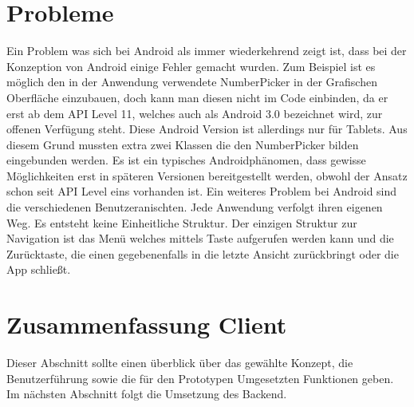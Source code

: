 \section{Probleme}

Ein Problem was sich bei Android als immer wiederkehrend zeigt ist, dass bei der Konzeption von Android einige Fehler gemacht wurden. Zum Beispiel ist es möglich den in der Anwendung verwendete NumberPicker in der Grafischen Oberfläche einzubauen, doch kann man diesen nicht im Code einbinden, da er erst ab dem API Level 11, welches auch als Android 3.0 bezeichnet wird, zur offenen Verfügung steht. Diese Android Version ist allerdings nur für Tablets. Aus diesem Grund mussten extra zwei Klassen die den NumberPicker bilden eingebunden werden. Es ist ein typisches Androidphänomen, dass gewisse Möglichkeiten erst in späteren Versionen bereitgestellt werden, obwohl der Ansatz schon seit API Level eins vorhanden ist. Ein weiteres Problem bei Android sind die verschiedenen Benutzeranischten. Jede Anwendung verfolgt ihren eigenen Weg. Es entsteht keine Einheitliche Struktur. Der einzigen Struktur zur Navigation ist das Menü welches mittels Taste aufgerufen werden kann und die Zurücktaste, die einen gegebenenfalls in die letzte Ansicht zurückbringt oder die App schließt.  


\section{Zusammenfassung Client}

Dieser Abschnitt sollte einen überblick über das gewählte Konzept, die Benutzerführung sowie die für den Prototypen Umgesetzten Funktionen geben. Im nächsten Abschnitt folgt die Umsetzung des Backend.  


